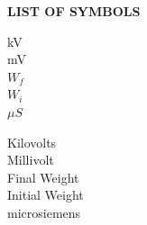 \newpage
{}
{}
\begin{center}
\Large\bf {LIST OF SYMBOLS}
\end{center}
\vspace{1.5cm}

\begin{minipage}{0.10\textwidth}
    \sloppy
    kV\\
    mV\\
    $W_f$\\
    $W_i$\\
    $ \mu S$
   
    
\end{minipage}
\hfill
\begin{minipage}{0.85\textwidth}
    \sloppy
    Kilovolts \\
    Millivolt\\
    Final Weight \\
    Initial Weight \\
    microsiemens

    
\end{minipage}